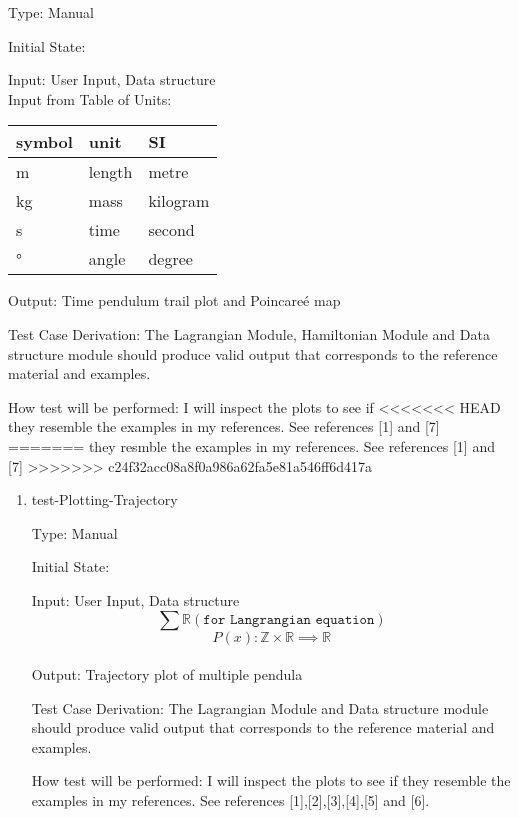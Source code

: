 \documentclass[12pt, titlepage]{article}
\begin{document}
{\begin{enumerate}
	Type: Manual
	
	Initial State: 
	
	Input: User Input, Data structure\\
	Input from Table of Units:\\
  \noindent \begin{tabular}{l l l} 
    \toprule		
    \textbf{symbol} & \textbf{unit} & \textbf{SI}\\
    \midrule 
    \si{\metre} & length & metre\\
    \si{\kilogram} & mass & kilogram\\
    \si{\second} & time & second\\
    \si{\degree} & angle & degree\\
    \bottomrule
  \end{tabular}
	
	Output: Time pendulum trail plot and Poincare\'{e} map
	
	Test Case Derivation: The Lagrangian Module, Hamiltonian Module and 
	Data structure module should produce valid
	output that corresponds to the reference material and examples.
	
	How test will be performed: I will inspect the plots to see if 
<<<<<<< HEAD
	they resemble the examples in my references. See references [1] and [7]
=======
	they resmble  the examples in my references. See
        references [1] and [7] 
>>>>>>> c24f32acc08a8f0a986a62fa5e81a546ff6d417a
\end{enumerate} 

\begin{enumerate}				
	\item{test-Plotting-Trajectory\\}
	
	Type: Manual
	
	Initial State: 
	
	Input: User Input, Data structure
$$\sum \mathbb{R} (\texttt{for Langrangian equation})$$
$$ P(x) :\mathbb{Z} \times \mathbb{R} \implies \mathbb{R}$$\\
	
	Output: Trajectory plot of multiple pendula
	
	Test Case Derivation: The Lagrangian Module and Data structure module 
	should produce valid
	output that corresponds to the reference material and examples.
	
	How test will be performed: I will inspect the plots to see if 
	they resemble the examples in my references. See references 
	[1],[2],[3],[4],[5] and [6].
\end{enumerate}

}
\end{document}
